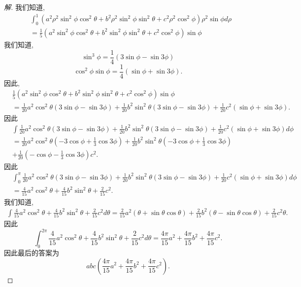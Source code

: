 \documentclass[a4paper, 12pt]{article} %
\begin{document}
\begin{CJK}{UTF8}{gkai}
\begin{proof}[解]
我们知道,
\begin{align*}
&  \int_0^1(a^2\rho^2\sin^2\phi\cos^2\theta+b^2\rho^2\sin^2\phi\sin^2\theta+c^2\rho^2\cos^2\phi)\rho^2\sin\phi
  d\rho\\&=\frac{1}{5}(a^2\sin^2\phi\cos^2\theta+b^2\sin^2\phi\sin^2\theta+c^2\cos^2\phi)\sin\phi
\end{align*}
我们知道,
$$
\sin^3\phi=\frac{1}{4} (3 \sin \phi-\sin 3\phi)
$$
$$
\cos^2\phi\sin\phi=\frac{1}{4} (\sin \phi+\sin 3\phi).
$$
因此,
\begin{align*}
&\frac{1}{5}(a^2\sin^2\phi\cos^2\theta+b^2\sin^2\phi\sin^2\theta+c^2\cos^2\phi)\sin\phi\\&=\frac{1}{20}a^2\cos^2\theta(3\sin
\phi-\sin 3\phi)+\frac{1}{20}b^2\sin^2\theta(3\sin \phi-\sin
3\phi)+\frac{1}{20}c^2(\sin \phi+\sin 3\phi).
\end{align*}
因此
\begin{align*}
&  \int \frac{1}{20}a^2\cos^2\theta(3\sin
\phi-\sin 3\phi)+\frac{1}{20}b^2\sin^2\theta(3\sin \phi-\sin
3\phi)+\frac{1}{20}c^2(\sin
\phi+\sin 3\phi)d\phi\\&=
\frac{1}{20}a^2\cos^2\theta
(-3\cos\phi+\frac{1}{3}\cos 3\phi)+\frac{1}{20}b^2\sin^2\theta(-3\cos\phi+\frac{1}{3}\cos3\phi)\\&+\frac{1}{20}(-\cos\phi-\frac{1}{3}\cos3\phi)c^{2}.
\end{align*}
因此
\begin{align*}
&  \int_0^{\pi}\frac{1}{20}a^2\cos^2\theta(3\sin
\phi-\sin 3\phi)+\frac{1}{20}b^2\sin^2\theta(3\sin \phi-\sin
3\phi)+\frac{1}{20}c^2(\sin
\phi+\sin 3\phi)d\phi\\&=\frac{4}{15}a^2\cos^2\theta+\frac{4}{15}b^2\sin^2\theta+\frac{2}{15}c^{2}.
\end{align*}
我们知道,
\begin{align*}
  \int \frac{4}{15}a^2\cos^2\theta+\frac{4}{15}b^2\sin^2\theta+\frac{2}{15}c^2d\theta=\frac{2}{15}a^2(\theta+\sin\theta\cos\theta)+\frac{2}{15}b^2(\theta-\sin\theta\cos\theta)+\frac{2}{15}c^2\theta.
\end{align*}
因此
$$
\int_0^{2\pi}\frac{4}{15}a^2\cos^2\theta+\frac{4}{15}b^2\sin^2\theta+\frac{2}{15}c^2d\theta=\frac{4\pi}{15}a^2+\frac{4\pi}{15}b^2+\frac{4\pi}{15}c^2.
$$
因此最后的答案为
$$
abc(\frac{4\pi}{15}a^2+\frac{4\pi}{15}b^2+\frac{4\pi}{15}c^2).
$$

\end{proof}
  

  

  
\end{CJK}
\end{document}
